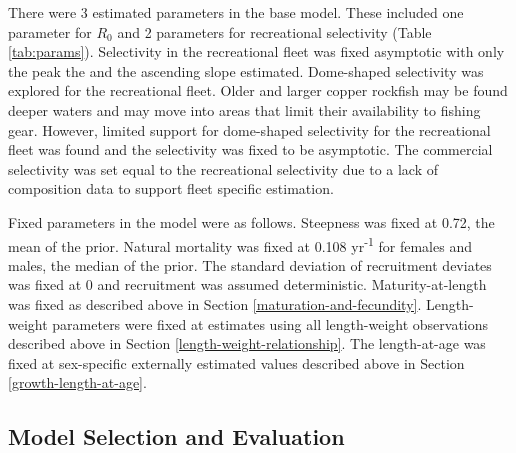 \documentclass[11pt,
  english,
  a4paper,
]{article}
\begin{document}
\leavevmode\tagmcend\tagstructend


There were 3 estimated parameters in the base model. These included one parameter for {\(R_0\)\leavevmode\tagmcend\tagstructend} and 2 parameters for recreational selectivity (Table \ref{tab:params}). Selectivity in the recreational fleet was fixed asymptotic with only the peak the and the ascending slope estimated. Dome-shaped selectivity was explored for the recreational fleet. Older and larger copper rockfish may be found deeper waters and may move into areas that limit their availability to fishing gear. However, limited support for dome-shaped selectivity for the recreational fleet was found and the selectivity was fixed to be asymptotic. The commercial selectivity was set equal to the recreational selectivity due to a lack of composition data to support fleet specific estimation.

\leavevmode\tagmcend\tagstructend\par


Fixed parameters in the model were as follows. Steepness was fixed at 0.72, the mean of the prior. Natural mortality was fixed at 0.108 yr\textsuperscript{-1} for females and males, the median of the prior. The standard deviation of recruitment deviates was fixed at 0 and recruitment was assumed deterministic. Maturity-at-length was fixed as described above in Section \ref{maturation-and-fecundity}. Length-weight parameters were fixed at estimates using all length-weight observations described above in Section \ref{length-weight-relationship}. The length-at-age was fixed at sex-specific externally estimated values described above in Section \ref{growth-length-at-age}.

\leavevmode\tagmcend\tagstructend\par


\hypertarget{model-selection-and-evaluation}{%
\subsection{Model Selection and Evaluation}\label{model-selection-and-evaluation}}

\leavevmode\tagmcend\tagstructend

\end{document}
